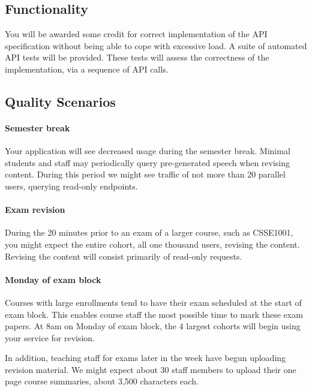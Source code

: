 \documentclass{csse4400}
\begin{document}
\subsection{Functionality}
You will be awarded some credit for correct implementation of the API specification without being able to cope with excessive load.
A suite of automated API tests will be provided.
These tests will assess the correctness of the implementation,
via a sequence of API calls.

\subsection{Quality Scenarios}

\paragraph{Semester break}
Your application will see decreased usage during the semester break.
Minimal students and staff may periodically query pre-generated speech when revising content.
During this period we might see traffic of not more than 20 parallel users,
querying read-only endpoints.


\paragraph{Exam revision}
During the 20 minutes prior to an exam of a larger course, such as CSSE1001,
you might expect the entire cohort, all one thousand users,
revising the content.
Revising the content will consist primarily of read-only requests.

\paragraph{Monday of exam block}
Courses with large enrollments tend to have their exam scheduled at the start of exam block.
This enables course staff the most possible time to mark these exam papers.
At 8am on Monday of exam block,
the 4 largest cohorts will begin using your service for revision.

In addition, teaching staff for exams later in the week have begun uploading revision material.
We might expect about 30 staff members to upload their one page course summaries,
about 3,500 characters each.
\end{document}
